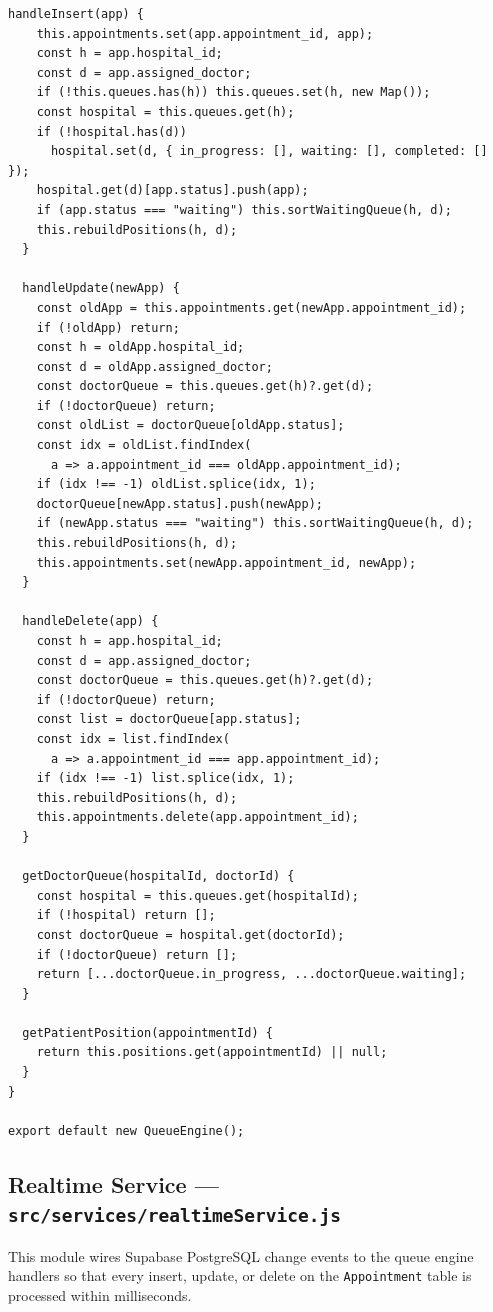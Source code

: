 \documentclass[12pt,onecolumn]{IEEEtran}
\begin{document}
\begin{lstlisting}[caption={Queue Engine — in-memory queue management and realtime mutation handlers}]
  handleInsert(app) {
    this.appointments.set(app.appointment_id, app);
    const h = app.hospital_id;
    const d = app.assigned_doctor;
    if (!this.queues.has(h)) this.queues.set(h, new Map());
    const hospital = this.queues.get(h);
    if (!hospital.has(d))
      hospital.set(d, { in_progress: [], waiting: [], completed: [] });
    hospital.get(d)[app.status].push(app);
    if (app.status === "waiting") this.sortWaitingQueue(h, d);
    this.rebuildPositions(h, d);
  }

  handleUpdate(newApp) {
    const oldApp = this.appointments.get(newApp.appointment_id);
    if (!oldApp) return;
    const h = oldApp.hospital_id;
    const d = oldApp.assigned_doctor;
    const doctorQueue = this.queues.get(h)?.get(d);
    if (!doctorQueue) return;
    const oldList = doctorQueue[oldApp.status];
    const idx = oldList.findIndex(
      a => a.appointment_id === oldApp.appointment_id);
    if (idx !== -1) oldList.splice(idx, 1);
    doctorQueue[newApp.status].push(newApp);
    if (newApp.status === "waiting") this.sortWaitingQueue(h, d);
    this.rebuildPositions(h, d);
    this.appointments.set(newApp.appointment_id, newApp);
  }

  handleDelete(app) {
    const h = app.hospital_id;
    const d = app.assigned_doctor;
    const doctorQueue = this.queues.get(h)?.get(d);
    if (!doctorQueue) return;
    const list = doctorQueue[app.status];
    const idx = list.findIndex(
      a => a.appointment_id === app.appointment_id);
    if (idx !== -1) list.splice(idx, 1);
    this.rebuildPositions(h, d);
    this.appointments.delete(app.appointment_id);
  }

  getDoctorQueue(hospitalId, doctorId) {
    const hospital = this.queues.get(hospitalId);
    if (!hospital) return [];
    const doctorQueue = hospital.get(doctorId);
    if (!doctorQueue) return [];
    return [...doctorQueue.in_progress, ...doctorQueue.waiting];
  }

  getPatientPosition(appointmentId) {
    return this.positions.get(appointmentId) || null;
  }
}

export default new QueueEngine();
\end{lstlisting}

\subsection{Realtime Service — \texttt{src/services/realtimeService.js}}
This module wires Supabase PostgreSQL change events to the queue engine handlers so that every insert, update, or delete on the \texttt{Appointment} table is processed within milliseconds.
\end{document}
